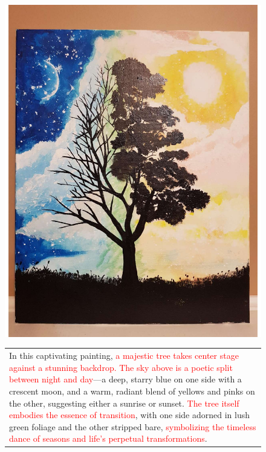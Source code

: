 \begin{figure}[!t]
\begin{minipage}[c]{0.33\textwidth}
        \centering
        \includegraphics[width=\textwidth]{images/tree-qualitative_compressed.pdf}
    \end{minipage}
    \begin{minipage}[c]{0.8\textwidth}
\centering
\scriptsize
\begin{tabular}{p{7cm}}
\scriptsize
In this captivating painting, \textcolor{red}{a majestic tree takes center stage against a stunning backdrop. The sky above is a poetic split between night and day}—a deep, starry blue on one side with a crescent moon, and a warm, radiant blend of yellows and pinks on the other, suggesting either a sunrise or sunset. \textcolor{red}{The tree itself embodies the essence of transition}, with one side adorned in lush green foliage and the other stripped bare, \textcolor{red}{symbolizing the timeless dance of seasons and life's perpetual transformations}.


\end{tabular}
\end{minipage}
\end{figure}
